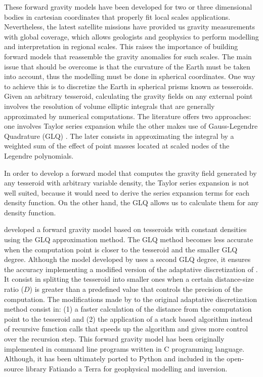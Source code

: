 \documentclass[extra]{gji}
\begin{document}
These forward gravity models have been developed for two or three dimensional bodies in cartesian coordinates that properly fit local scales applications.
Nevertheless, the latest satellite missions have provided us gravity measurements with global coverage, which allows geologists and geophysics to perform modelling and interpretation in regional scales.
This raises the importance of building forward models that reassemble the gravity anomalies for such scales. The main issue that should be overcome is that the curvature of the Earth must be taken into account, thus the modelling must be done in spherical coordinates.
One way to achieve this is to discretize the Earth in spherical prisms known as tesseroids. 
Given an arbitrary tesseroid, calculating the gravity fields on any external point involves the resolution of volume elliptic integrals  that are generally approximated by numerical computations.
The literature offers two approaches: one involves Taylor series expansion  while the other makes use of Gauss-Legendre Quadrature (GLQ) . The later consists in approximating the integral by a weighted sum of the effect of point masses located at scaled nodes of the Legendre polynomials.

In order to develop a forward model that computes the gravity field generated by any tesseroid with arbitrary variable density, the Taylor series expansion is not well suited, because it would need to derive the series expansion terms for each density function. On the other hand, the GLQ allows us to calculate them for any density function.

\citet{Uieda2016} developed a forward gravity model based on tesseroids with constant densities using the GLQ approximation method.
The GLQ method becomes less accurate when the computation point is closer to the tesseroid  and the smaller GLQ degree. 
Although the model developed by \citet{Uieda2016} uses a second GLQ degree, it ensures the accuracy implementing a modified version of the adaptative discretization of \citet{Li2011}.
It consist in splitting the tesseroid into smaller ones when a certain distance-size ratio ($D$) is greater than a predefined value that controls the precision of the computation. %
The modifications made by \citet{Uieda2016} to the original adaptative discretization method \citep{Li2011} consist in:
(1) a faster calculation of the distance from the computation point to the tesseroid and 
(2) the application of a stack based algorithm instead of recursive function calls that  speeds up the algorithm and gives more control over the recursion step.
This forward gravity model has been originally implemented in command line programs written in C programming language. Although, it has been ultimately ported to Python and included in the open-source library Fatiando a Terra  for geophysical modelling and inversion.
\end{document}
